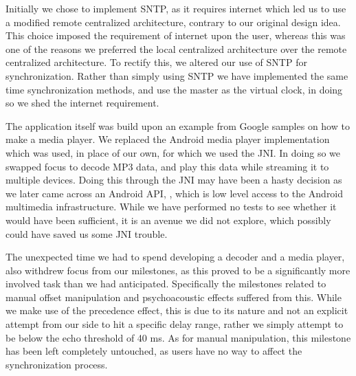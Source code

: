 Initially we chose to implement \ac{SNTP}, as it requires internet which led us to use a modified remote centralized architecture, contrary to our original design idea.
This choice imposed the requirement of internet upon the user, whereas this was one of the reasons we preferred the local centralized architecture over the remote centralized architecture.
To rectify this, we altered our use of \ac{SNTP} for synchronization.
Rather than simply using \ac{SNTP} we have implemented the same time synchronization methods, and use the master as the virtual clock, in doing so we shed the internet requirement.

\bigskip
The application itself was build upon an example from Google samples on how to make a media player.
We replaced the Android media player implementation which was used, in place of our own, for which we used the \ac{JNI}.
In doing so we swapped focus to decode MP3 data, and play this data while streaming it to multiple devices.
Doing this through the \ac{JNI} may have been a hasty decision as we later came across an Android API, , which is low level access to the Android multimedia infrastructure.
While we have performed no tests to see whether it would have been sufficient, it is an avenue we did not explore, which possibly could have saved us some \ac{JNI} trouble.

The unexpected time we had to spend developing a decoder and a media player, also withdrew focus from our milestones, as this proved to be a significantly more involved task than we had anticipated.
Specifically the milestones related to manual offset manipulation and psychoacoustic effects suffered from this.
While we make use of the precedence effect, this is due to its nature and not an explicit attempt from our side to hit a specific delay range, rather we simply attempt to be below the echo threshold of 40 ms.
As for manual manipulation, this milestone has been left completely untouched, as users have no way to affect the synchronization process.


